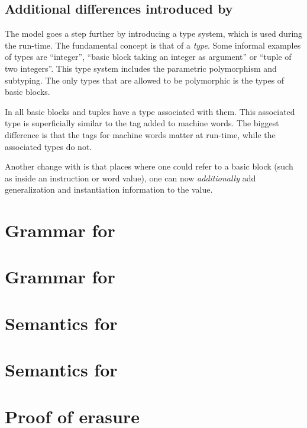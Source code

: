 \subsection{Additional differences introduced by \ATAL}

The \ATAL model goes a step further by introducing a type system, which is used
during the run-time. The fundamental concept is that of a \emph{type}. Some
informal examples of types are ``integer'', ``basic block taking an integer as
argument'' or ``tuple of two integers''. This type system includes the
parametric polymorphism and subtyping. The only types that are allowed to be
polymorphic is the types of basic blocks.

In \ATAL all basic blocks and tuples have a type associated with them. This
associated type is superficially similar to the tag added to machine words. The
biggest difference is that the tags for machine words matter at run-time, while
the associated types do not.

Another change with \ATAL is that places where one could refer to a basic block
(such as inside an instruction or word value), one can now \emph{additionally}
add generalization and instantiation information to the value.

\section{Grammar for \ATALe}
\section{Grammar for \ATAL}
\section{Semantics for \ATAL}
\section{Semantics for \ATALe}
\section{Proof of erasure}
\label{sec:erasure}




